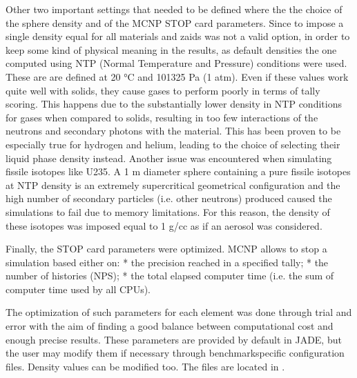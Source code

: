 \documentclass[letterpaper,10pt,english]{sphinxmanual}
\begin{document}
\sphinxAtStartPar
Other two important settings that needed to be defined where the the choice of the sphere density
and of the MCNP STOP card parameters. Since to impose a
single density equal for all materials and  zaids was not a valid option, in order to keep some
kind of physical meaning in the results, as default densities the one computed using NTP
(Normal Temperature and Pressure) conditions were used. These are are defined at 20 °C and
101325 Pa (1 atm). Even if these values work quite well with solids, they cause gases to perform
poorly in terms of tally scoring. This happens due to the substantially lower density in NTP conditions
for gases when compared to solids, resulting in too few interactions of the neutrons and secondary photons
with the material. This has been proven to be especially true for hydrogen and helium, leading to the
choice of selecting their liquid phase density instead. Another issue was encountered when simulating
fissile isotopes like U235. A 1 m diameter sphere containing a pure fissile isotopes at NTP density is
an extremely super\sphinxhyphen{}critical geometrical configuration and the high number of secondary particles (i.e. other neutrons) produced
caused the simulations to fail due to memory limitations. For this reason, the density of these isotopes
was imposed equal to 1 g/cc as if an aerosol was considered.

\sphinxAtStartPar
Finally, the STOP card parameters were optimized. MCNP allows to stop a simulation based either on:
* the precision reached in a specified tally;
* the number of histories (NPS);
* the total elapsed computer time (i.e. the sum of computer time used by all CPUs).

\sphinxAtStartPar
The optimization of such parameters for each element was done through trial and error with the aim of
finding a good balance between computational cost and enough precise results.
These parameters are provided by default in JADE, but the user may modify them if necessary through
benchmark\sphinxhyphen{}specific configuration files. Density values can be modified too. The files are located in
.
\end{document}
